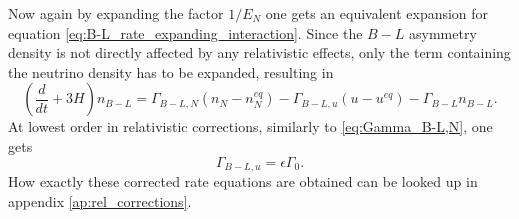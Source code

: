 Now again by expanding the factor $1/E_N$ one gets an equivalent expansion for equation \eqref{eq:B-L_rate_expanding_interaction}. Since the $B-L$ asymmetry density is not directly affected by any relativistic effects, only the term containing the neutrino density has to be expanded, resulting in
\begin{equation}
	\left(\frac{d}{dt}+3H\right)n_{B-L}=\Gamma_{B-L,N}\left(n_N-n_N^{eq}\right)-\Gamma_{B-L,u}\left(u-u^{eq}\right)-\Gamma_{B-L}n_{B-L}.
	\label{eq:B-L_rate_expanding_interaction_rel}
\end{equation}
At lowest order in relativistic corrections, similarly to \eqref{eq:Gamma_B-L,N}, one gets
\begin{equation}
	\Gamma_{B-L,u}=\epsilon\Gamma_0.
	\label{eq:Gamma_B-L,u}
\end{equation}
How exactly these corrected rate equations are obtained can be looked up in appendix \ref{ap:rel_corrections}.
